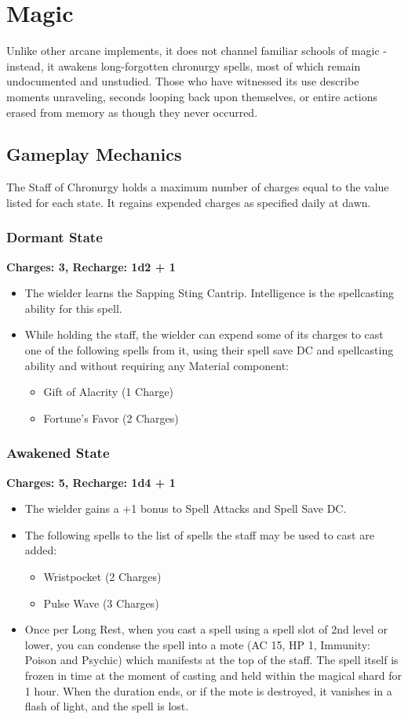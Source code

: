 \section*{Magic}
{\entryfont Unlike other arcane implements, it does not channel familiar schools of magic - instead, it awakens long-forgotten chronurgy spells, most of which remain undocumented and unstudied. Those who have witnessed its use describe moments unraveling, seconds looping back upon themselves, or entire actions erased from memory as though they never occurred.}
\vfill\eject
\subsection*{Gameplay Mechanics}
{\entryfont The Staff of Chronurgy holds a maximum number of charges equal to the value listed for each state. It regains expended charges as specified daily at dawn.
\subsubsection*{Dormant State}
\textbf{Charges: 3, Recharge: 1d2 + 1}
\begin{itemize}
	\item The wielder learns the Sapping Sting Cantrip. Intelligence is the spellcasting ability for this spell.
	\item While holding the staff, the wielder can expend some of its charges to cast one of the following spells from it, using their spell save DC and spellcasting ability and without requiring any Material component:
	\begin{itemize}
		\item Gift of Alacrity (1 Charge)
		\item Fortune's Favor (2 Charges)
	\end{itemize}
\end{itemize}
\subsubsection*{Awakened State}
\textbf{Charges: 5, Recharge: 1d4 + 1}
\begin{itemize}
	\item The wielder gains a +1 bonus to Spell Attacks and Spell Save DC.
	\item The following spells to the list of spells the staff may be used to cast are added:
	\begin{itemize}
		\item Wristpocket (2 Charges)
		\item Pulse Wave (3 Charges)
	\end{itemize}
	\item Once per Long Rest, when you cast a spell using a spell slot of 2nd level or lower, you can condense the spell into a mote (AC 15, HP 1, Immunity: Poison and Psychic) which manifests at the top of the staff. The spell itself is frozen in time at the moment of casting and held within the magical shard for 1 hour. When the duration ends, or if the mote is destroyed, it vanishes in a flash of light, and the spell is lost.
	

\end{itemize}}
